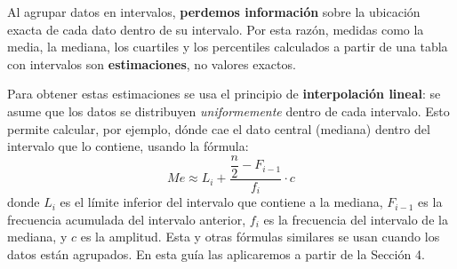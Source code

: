 \documentclass[11pt, letterpaper]{article}
\begin{document}
\begin{tcolorbox}[importantbox, title={Nota importante: estimación mediante interpolación lineal}]
Al agrupar datos en intervalos, \textbf{perdemos información} sobre la ubicación exacta de cada dato dentro de su intervalo. Por esta razón, medidas como la media, la mediana, los cuartiles y los percentiles calculados a partir de una tabla con intervalos son \textbf{estimaciones}, no valores exactos.

\medskip
Para obtener estas estimaciones se usa el principio de \textbf{interpolación lineal}: se asume que los datos se distribuyen \textit{uniformemente} dentro de cada intervalo. Esto permite calcular, por ejemplo, dónde cae el dato central (mediana) dentro del intervalo que lo contiene, usando la fórmula:
\[
Me \approx L_i + \frac{\dfrac{n}{2} - F_{i-1}}{f_i} \cdot c
\]
donde $L_i$ es el límite inferior del intervalo que contiene a la mediana, $F_{i-1}$ es la frecuencia acumulada del intervalo anterior, $f_i$ es la frecuencia del intervalo de la mediana, y $c$ es la amplitud. Esta y otras fórmulas similares se usan cuando los datos están agrupados. En esta guía las aplicaremos a partir de la Sección 4.
\end{tcolorbox}
\end{document}
